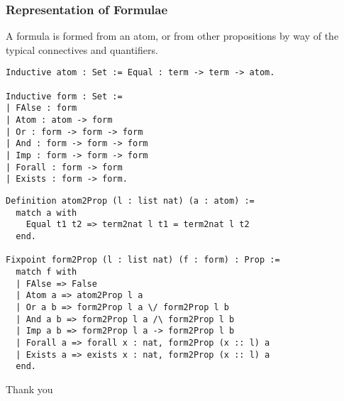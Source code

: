 \documentclass{beamer}
\begin{document}
\begin{frame}[fragile]\justifying
  \frametitle{Representation of Formulae}
  A formula is formed from an atom, or from other propositions by way of the typical connectives and quantifiers.
\begin{verbatim}
Inductive atom : Set := Equal : term -> term -> atom.

Inductive form : Set :=
| FAlse : form
| Atom : atom -> form
| Or : form -> form -> form
| And : form -> form -> form
| Imp : form -> form -> form
| Forall : form -> form
| Exists : form -> form.
\end{verbatim}
\end{frame}

\begin{frame}[fragile]
\begin{verbatim}
Definition atom2Prop (l : list nat) (a : atom) :=
  match a with
    Equal t1 t2 => term2nat l t1 = term2nat l t2
  end.

Fixpoint form2Prop (l : list nat) (f : form) : Prop :=
  match f with
  | FAlse => False
  | Atom a => atom2Prop l a
  | Or a b => form2Prop l a \/ form2Prop l b
  | And a b => form2Prop l a /\ form2Prop l b
  | Imp a b => form2Prop l a -> form2Prop l b
  | Forall a => forall x : nat, form2Prop (x :: l) a
  | Exists a => exists x : nat, form2Prop (x :: l) a
  end.
\end{verbatim}
\end{frame}
\begin{frame}
  \begin{center}
    {\Huge Thank you}
  \end{center}
\end{frame}
\end{document}
